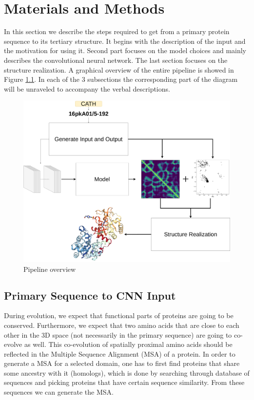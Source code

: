 \chapter{Materials and Methods}

In this section we describe the steps required to get from a primary protein sequence to its tertiary structure.
It begins with the description of the input and the motivation for using it. 
Second part focuses on the model choices and mainly describes the convolutional neural network. 
The last section focuses on the structure realization. 
A graphical overview of the entire pipeline is showed in Figure \ref{fig:project_pipeline}. 
In each of the 3 subsections the corresponding part of the diagram will be unraveled to accompany the verbal descriptions.

\begin{figure}[ht]
    \centering
    \includegraphics[width=0.8\linewidth]{imgs_tomas/Project_pipeline_small.png}
    \caption{Pipeline overview}
    \label{fig:project_pipeline}
\end{figure}

\section{Primary Sequence to CNN Input}

During evolution, we expect that functional parts of proteins are going to be conserved. 
Furthermore, we expect that two amino acids that are close to each other in the 3D space (not necessarily in the primary sequence) are going to co-evolve as well. 
This co-evolution of spatially proximal amino acids should be reflected in the Multiple Sequence Alignment (MSA) of a protein. 
In order to generate a MSA for a selected domain, one has to first find proteins that share some ancestry with it (homologs), which is done by searching through database of sequences and picking proteins that have certain sequence similarity. 
From these sequences we can generate the MSA.
    
